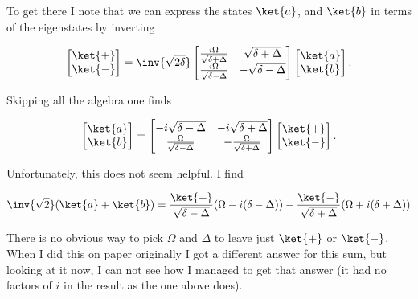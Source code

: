{To get there I note that we can express the states \(\ket{a}\), and \(\ket{b}\) in terms of the eigenstates by inverting

\begin{equation}\label{eqn:qmIexamPractice2008Dec:2:150}
\begin{bmatrix}
\ket{+} \\
\ket{-} \\
\end{bmatrix}
=\inv{\sqrt{2\delta}}
\begin{bmatrix}
\frac{i \Omega}{\sqrt{\delta + \Delta}} & \sqrt{\delta + \Delta} \\
\frac{i \Omega}{\sqrt{\delta - \Delta}} & -\sqrt{\delta - \Delta}
\end{bmatrix}
\begin{bmatrix}
\ket{a} \\
\ket{b} \\
\end{bmatrix}.
\end{equation}

Skipping all the algebra one finds

\begin{equation}\label{eqn:qmIexamPractice2008Dec:2:160}
\begin{bmatrix}
\ket{a} \\
\ket{b} \\
\end{bmatrix}
=
\begin{bmatrix}
-i\sqrt{\delta - \Delta} & -i\sqrt{\delta + \Delta} \\
\frac{\Omega}{\sqrt{\delta - \Delta}} &
-\frac{\Omega}{\sqrt{\delta + \Delta}} 
\end{bmatrix}
\begin{bmatrix}
\ket{+} \\
\ket{-} \\
\end{bmatrix}.
\end{equation}

Unfortunately, this does not seem helpful.  I find

\begin{equation}\label{eqn:qmIexamPractice2008Dec:2:170}
\inv{\sqrt{2}} ( \ket{a} + \ket{b} ) = 
\frac{\ket{+}}{\sqrt{\delta - \Delta}}( \Omega - i (\delta - \Delta) )
-\frac{\ket{-}}{\sqrt{\delta + \Delta}}( \Omega + i (\delta + \Delta) )
\end{equation}

There is no obvious way to pick \(\Omega\) and \(\Delta\) to leave just \(\ket{+}\) or \(\ket{-}\).  When I did this on paper originally I got a different answer for this sum, but looking at it now, I can not see how I managed to get that answer (it had no factors of \(i\) in the result as the one above does).

}
